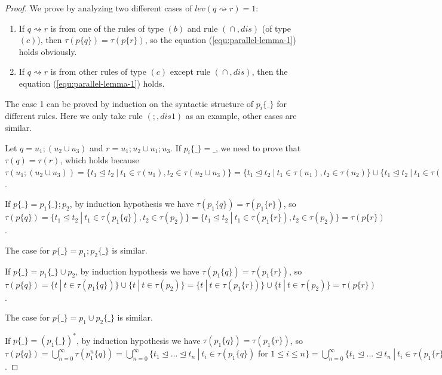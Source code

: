 \documentclass{fcs}
\DeclareMathOperator{\seq}{;}
\DeclareMathOperator{\para}{\cap}
\newcommand{\place}[0]{\_}
\newcommand{\red}[0]{\rightsquigarrow}
\DeclareMathOperator{\link}{\unlhd}
\newcommand{\lev}[0]{\mathit{lev}}
\begin{document}
\begin{proof}
    We prove by analyzing two different cases of $\lev(q\red r) = 1$:
    \begin{enumerate}
    \item If $q\red r$ is from one of the rules of type $(b)$ and rule $(\para, \mathit{dis})$ (of type $(c)$), then
    $\tau(p\{q\}) = \tau(p\{r\})$, so the equation (\ref{equ:parallel-lemma-1}) holds obviously.
    \item If $q\red r$ is from other rules of type $(c)$ except rule $(\para, \mathit{dis})$, then
    the equation (\ref{equ:parallel-lemma-1}) holds.
    \end{enumerate}

    The case 1 can be proved by induction on the syntactic structure of $p_i\{\place\}$ for different rules. Here we only take rule $(\seq, \mathit{dis}1)$ as an example, other cases are similar.

    Let $q = u_1\seq (u_2\cup u_3)$ and $r = u_1\seq u_2\cup u_1\seq u_3$.
    If $p_i\{\place\} = \place$, we need to prove that $\tau(q) = \tau(r)$, which holds because $\tau(u_1\seq (u_2\cup u_3)) = \{t_1\link t_2\ |\ t_1\in \tau(u_1), t_2\in \tau(u_2\cup u_3)\} = \{t_1\link t_2\ |\ t_1\in \tau(u_1), t_2\in \tau(u_2)\}\cup \{t_1\link t_2\ |\ t_1\in \tau(u_1), t_2\in \tau(u_3)\} = \tau(u_1\seq u_2)\cup \tau(u_1\seq u_3) = \tau(u_1\seq u_2\cup u_1\seq u_3)$.

    If $p\{\place\} = p_1\{\place\}\seq p_2$, by induction hypothesis we have $\tau(p_1\{q\}) = \tau(p_1\{r\})$,
    so $\tau(p\{q\}) = \{t_1\link t_2\ |\ t_1\in \tau(p_1\{q\}), t_2\in \tau(p_2)\} = \{t_1\link t_2\ |\ t_1\in \tau(p_1\{r\}), t_2\in \tau(p_2)\} = \tau(p\{r\})$.

    The case for $p\{\place\} = p_1\seq p_2\{\place\}$ is similar.

    If $p\{\place\} = p_1\{\place\}\cup p_2$, by induction hypothesis we have $\tau(p_1\{q\}) = \tau(p_1\{r\})$,
    so $\tau(p\{q\}) = \{t\ |\ t\in \tau(p_1\{q\})\}\cup \{t\ |\ t\in \tau(p_2)\} = \{t\ |\ t\in \tau(p_1\{r\})\}\cup \{t\ |\ t\in \tau(p_2)\} = \tau(p\{r\})$.

    The case for $p\{\place\} = p_1\cup p_2\{\place\}$ is similar.

    If $p\{\place\} = (p_1\{\place\})^*$, by induction hypothesis we have $\tau(p_1\{q\}) = \tau(p_1\{r\})$,
    so $\tau(p\{q\}) = \bigcup^\infty_{n=0}\tau(p^n_1\{q\}) = \bigcup^\infty_{n=0}\{t_1\link...\link t_n\ |\ t_i\in \tau(p_1\{q\})\mbox{ for $1\le i\le n$}\} = \bigcup^\infty_{n=0}\{t_1\link...\link t_n\ |\ t_i\in \tau(p_1\{r\})\mbox{ for $1\le i\le n$}\} = \bigcup^\infty_{n=0}\tau(p^n_1\{r\}) = \tau(p\{r\})$.


\end{proof}
\end{document}
